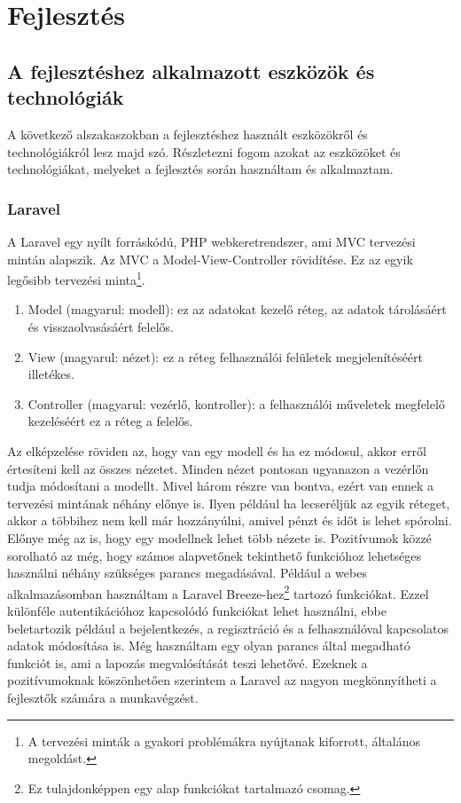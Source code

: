 \documentclass[]{thesis-ekf}
\theoremstyle{definition}
\theoremstyle{remark}
\begin{document}
	\chapter{Fejlesztés}\label{ch-fejlesztes}		
	\section{A fejlesztéshez alkalmazott eszközök és technológiák}
		A következő alszakaszokban a fejlesztéshez használt eszközökről és technológiákról lesz majd szó. Részletezni fogom azokat az eszközöket és technológiákat, melyeket a fejlesztés során használtam és alkalmaztam.
	\subsection{Laravel}\label{sc-laravel}
		A Laravel egy nyílt forráskódú, PHP webkeretrendszer, ami MVC tervezési mintán alapszik. Az MVC a Model-View-Controller rövidítése. Ez az egyik legősibb tervezési minta\footnote{A tervezési minták a gyakori problémákra nyújtanak kiforrott, általános megoldást.}.
		\begin{enumerate}
			\item Model (magyarul: modell): ez az adatokat kezelő réteg, az adatok tárolásáért és visszaolvasásáért felelős.
			\item View (magyarul: nézet): ez a réteg felhasználói felületek megjelenítéséért illetékes. 
			\item Controller (magyarul: vezérlő, kontroller): a felhasználói műveletek megfelelő kezeléséért ez a réteg a felelős.
		\end{enumerate}
		Az elképzelése röviden az, hogy van egy modell és ha ez módosul, akkor erről értesíteni kell az összes nézetet. Minden nézet pontosan ugyanazon a vezérlőn tudja módosítani a modellt. Mivel három részre van bontva, ezért van ennek a tervezési mintának néhány előnye is. Ilyen például ha lecseréljük az egyik réteget, akkor a többihez nem kell már hozzányúlni, amivel pénzt és időt is lehet spórolni. Előnye még az is, hogy egy modellnek lehet több nézete is. Pozitívumok közzé sorolható az még, hogy számos alapvetőnek tekinthető funkcióhoz lehetséges használni néhány szükséges parancs megadásával. Például a webes alkalmazásomban használtam a Laravel Breeze-hez\footnote{Ez tulajdonképpen egy alap funkciókat tartalmazó csomag.} tartozó funkciókat. Ezzel különféle autentikációhoz kapcsolódó funkciókat lehet használni, ebbe beletartozik például a bejelentkezés, a regisztráció és a felhasználóval kapcsolatos adatok módosítása is. Még használtam egy olyan parancs által megadható funkciót is, ami a lapozás megvalósítását teszi lehetővé. Ezeknek a pozitívumoknak köszönhetően szerintem a Laravel az nagyon megkönnyítheti a fejlesztők számára a munkavégzést. 
		\cite{Kusper, Laravel}
\end{document}
